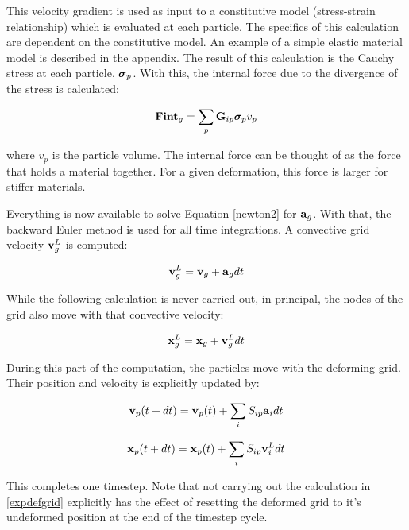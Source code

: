 This velocity gradient is used as input to a constitutive model 
(stress-strain
relationship) which is evaluated at each particle.  The 
specifics of this 
calculation are dependent on the constitutive model.  An example 
of a simple elastic material model is described in the appendix.  
The result of this
calculation is the Cauchy stress at each particle, $\boldsymbol{\sigma}_p$.  
With this,
the internal force due to the divergence of the stress is 
calculated:

\begin{equation}
	\mbox{\ensuremath{\mathbf{Fint}}}_g = \sum_{p} \mbox{\ensuremath{\mathbf{G}}}_{ip} \mbox{\boldmath $\sigma \!\!$ \unboldmath}_p v_p
\end{equation}

\noindent
where $v_p$ is the particle volume.  The internal force can be 
thought of as the force that holds a material together.  For a 
given deformation, this force is larger for stiffer materials.

Everything is now available to solve Equation \ref{newton2} for 
$\mbox{\ensuremath{\mathbf{a}}}_g$.
With that, the backward Euler method is used for all time 
integrations.
A convective grid velocity $\mbox{\ensuremath{\mathbf{v}}}^L_g$ is computed:

\begin{equation}
	\mbox{\ensuremath{\mathbf{v}}}^L_g = \mbox{\ensuremath{\mathbf{v}}}_g  + \mbox{\ensuremath{\mathbf{a}}}_g dt
\end{equation}

While the following calculation is never carried out, in 
principal, the
nodes of the grid also move with that convective velocity:

\begin{equation}
	\mbox{\ensuremath{\mathbf{x}}}^L_g = \mbox{\ensuremath{\mathbf{x}}}_g  + \mbox{\ensuremath{\mathbf{v}}}^L_g dt     
\label{expdefgrid}
\end{equation}

During this part of the computation, the particles move with the 
deforming
grid.  Their position and velocity is explicitly updated by:

\begin{equation}
	\mbox{\ensuremath{\mathbf{v}}}_p (t + dt)  = \mbox{\ensuremath{\mathbf{v}}}_p (t)  + \sum_{i} S_{ip} 
\mbox{\ensuremath{\mathbf{a}}}_i  dt
\end{equation}

\begin{equation}
	\mbox{\ensuremath{\mathbf{x}}}_p (t + dt)  = \mbox{\ensuremath{\mathbf{x}}}_p (t)  + \sum_{i} S_{ip} 
\mbox{\ensuremath{\mathbf{v}}}^L_i  dt
\end{equation}

This completes one timestep.  Note that not carrying out the 
calculation
in \ref{expdefgrid} explicitly has the effect of resetting the 
deformed
grid to it's undeformed position at the end of the timestep 
cycle.

